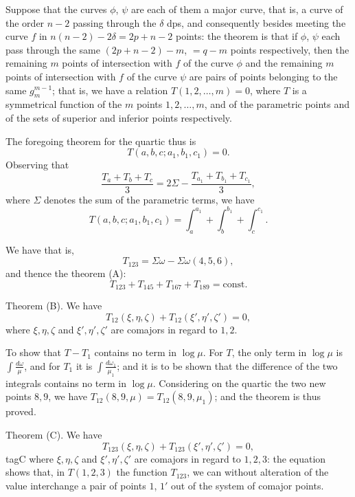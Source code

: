 \documentclass[11pt,a4paper]{book}
\begin{document}
\begin{art}
Suppose that the curves $\phi$, $\psi$ are each of them a major curve, that is, a curve of the order $n-2$ passing through the $\delta$ dps, and consequently besides meeting the curve $f$ in $n(n-2)-2\delta = 2p+n-2$ points: the theorem is that if $\phi$, $\psi$ each pass through the same $(2p+n-2)-m$, $=q-m$ points respectively, then the remaining $m$ points of intersection with $f$ of the curve $\phi$ and the remaining $m$ points of intersection with $f$ of the curve $\psi$ are pairs of points belonging to the same $g_{m}^{m-1}$; that is, we have a relation $T(1,2,\ldots,m) = 0$, where $T$ is a symmetrical function of the $m$ points $1,2,\ldots,m$, and of the parametric points and of the sets of superior and inferior points respectively.
\end{art}

\begin{art}
The foregoing theorem for the quartic thus is
\[
T(a,b,c; a_1,b_1,c_1) = 0.
\]
Observing that
\[
\frac{T_a + T_b + T_c}{3} = 2\Sigma - \frac{T_{a_1} + T_{b_1} + T_{c_1}}{3},
\]
where $\Sigma$ denotes the sum of the parametric terms, we have
\[
T(a,b,c; a_1,b_1,c_1) = \int_a^{a_1} + \int_b^{b_1} + \int_c^{c_1}.
\]
\end{art}

\begin{art}
We have that is,
\[
T_{123} = \Sigma\omega - \Sigma\omega(4,5,6),
\]
and thence the theorem (A):
\[
T_{123} + T_{145} + T_{167} + T_{189} = \text{const}.
\]
\end{art}

\begin{art}
Theorem (B). We have
\[
T_{12}(\xi,\eta,\zeta) + T_{12}(\xi',\eta',\zeta') = 0,
\]
where $\xi,\eta,\zeta$ and $\xi',\eta',\zeta'$ are comajors in regard to $1,2$.
\end{art}

\begin{art}
To show that $T - T_1$ contains no term in $\log \mu$. For $T$, the only term in $\log \mu$ is $\int \frac{d\omega}{\mu}$, and for $T_1$ it is $\int \frac{d\omega_1}{\mu_1}$; and it is to be shown that the difference of the two integrals contains no term in $\log \mu$. Considering on the quartic the two new points $8,9$, we have $T_{12}(8,9,\mu) = T_{12}(8,9,\mu_1)$; and the theorem is thus proved.
\end{art}

\begin{art}
Theorem (C). We have
\[
T_{123}(\xi,\eta,\zeta) + T_{123}(\xi',\eta',\zeta') = 0,
\]
tag{C}
where $\xi,\eta,\zeta$ and $\xi',\eta',\zeta'$ are comajors in regard to $1,2,3$: the equation shows that, in $T(1,2,3)$ the function $T_{123}$, we can without alteration of the value interchange a pair of points $1$, $1'$ out of the system of comajor points.
\end{art}
\end{document}
